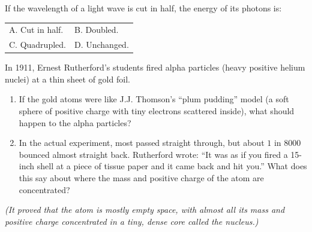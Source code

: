 \begin{checkpoint}[10.1]
If the wavelength of a light wave is cut in half, the energy of its photons is:
\newline
\begin{tabular}{ll}
  A. Cut in half. & B. Doubled. \\
  C. Quadrupled. & D. Unchanged.
\end{tabular}
\end{checkpoint}

\begin{whiteboard}
In 1911, Ernest Rutherford's students fired alpha particles (heavy positive helium nuclei) at a thin sheet of gold foil.
\begin{enumerate}[label=(\alph*), leftmargin=2.5em, itemsep=1pt]
  \item If the gold atoms were like J.J. Thomson's ``plum pudding'' model (a soft sphere of positive charge with tiny electrons scattered inside), what should happen to the alpha particles?
  \item In the actual experiment, most passed straight through, but about $1$ in $8000$ bounced almost straight back. Rutherford wrote: ``It was as if you fired a 15-inch shell at a piece of tissue paper and it came back and hit you.'' What does this say about where the mass and positive charge of the atom are concentrated?
\end{enumerate}
\textit{(It proved that the atom is mostly empty space, with almost all its mass and positive charge concentrated in a tiny, dense core called the nucleus.)}
\end{whiteboard}
